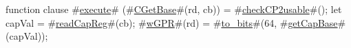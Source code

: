 function clause #\hyperref[zexecute]{execute}# (#\hyperref[zCGetBase]{CGetBase}#(rd, cb)) =
{
  #\hyperref[zcheckCP2usable]{checkCP2usable}#();
  let capVal = #\hyperref[zreadCapReg]{readCapReg}#(cb);
  #\hyperref[zwGPR]{wGPR}#(rd) = #\hyperref[ztozybits]{to\_bits}#(64, #\hyperref[zgetCapBase]{getCapBase}#(capVal));
}
